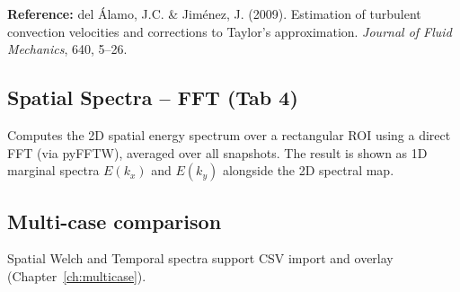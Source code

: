 \noindent\textbf{Reference:} del Álamo, J.C. \& Jiménez, J. (2009). Estimation of turbulent convection velocities and corrections to Taylor's approximation. \textit{Journal of Fluid Mechanics}, 640, 5--26.

\subsection{Spatial Spectra -- FFT (Tab 4)}

Computes the 2D spatial energy spectrum over a rectangular ROI using a direct FFT (via pyFFTW), averaged over all snapshots. The result is shown as 1D marginal spectra $E(k_x)$ and $E(k_y)$ alongside the 2D spectral map.

\subsection{Multi-case comparison}

Spatial Welch and Temporal spectra support CSV import and overlay (Chapter~\ref{ch:multicase}).

